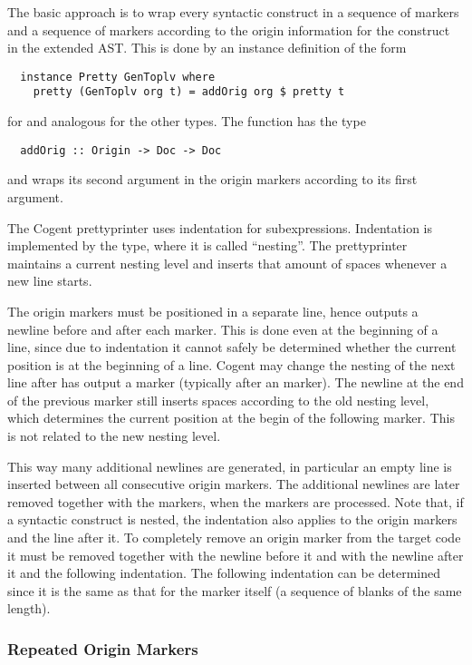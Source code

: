 The basic approach is to wrap every syntactic construct in a sequence of  markers and 
a sequence of  markers according to the origin information for the construct in the extended AST. 
This is done by an instance definition of the form
\begin{verbatim}
  instance Pretty GenToplv where
    pretty (GenToplv org t) = addOrig org $ pretty t
\end{verbatim}
for  and analogous for the other types. The function  has the type
\begin{verbatim}
  addOrig :: Origin -> Doc -> Doc
\end{verbatim}
and wraps its second argument in the origin markers according to its first argument.

The Cogent prettyprinter uses indentation for subexpressions. Indentation is implemented by the  type, 
where it is called ``nesting''. The prettyprinter maintains a
current nesting level and inserts that amount of spaces whenever a new line starts. 

The origin markers must be positioned in a separate line, hence  outputs a newline before and after
each marker. This is done even at the beginning of a line, since due to indentation it cannot safely be determined
whether the current position is at the beginning of a line. Cogent may change the nesting of the next line after 
has output a marker (typically after an  marker). The newline at the end of the previous marker 
still inserts spaces according to the old nesting level, which determines the current position at the begin of
the following marker. This is not related to the new nesting level. 

This way many additional newlines are generated, in
particular an empty line is inserted between all consecutive origin markers. The additional newlines are later removed
together with the markers, when the markers are processed. Note that, if a syntactic construct
is nested, the indentation also applies to the origin markers and the line after it. To completely remove an
origin marker from the target code it must be removed together with the newline before it and with the newline 
after it and the following indentation. The following indentation can be determined since it is the same as that 
for the marker itself (a sequence of blanks of the same length). 

\subsubsection{Repeated Origin Markers}

